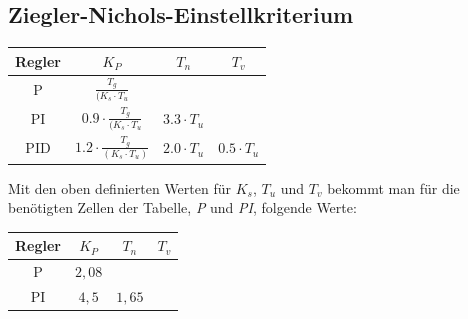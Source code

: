 \documentclass{article}
\begin{document}
		\subsection{Ziegler-Nichols-Einstellkriterium}
			\begin{center}
				\begin{tabular}{ c || c | c | c }
					 Regler & $K_P$ & $T_n$ & $T_v$ \\ 
					 \hline\hline
					 P & $\frac{T_g}{(K_s \cdot T_u}$ &  &  \\  
					 \hline
					 PI & $0.9 \cdot \frac{T_g}{(K_s \cdot T_u}$ & $3.3 \cdot T_u$ &    \\
					 \hline
					 PID & $1.2 \cdot \frac{T_g}{(K_s \cdot T_u)}$ & $2.0 \cdot T_u$ & $0.5 \cdot T_u$
				\end{tabular}
			\end{center}
\vspace{3mm}
			Mit den oben definierten Werten für $K_s$, $T_u$ und $T_v$ bekommt man für die benötigten Zellen der Tabelle, \textit{P} und \textit{PI}, folgende Werte:
			\begin{center}
				\begin{tabular}{ c || c | c | c }
					 Regler & $K_P$ & $T_n$ & $T_v$ \\ 
					 \hline\hline
					 P & $2,08$ &  &  \\  
					 \hline
					 PI & $4,5$ & $1,65$ & 
				\end{tabular}
			\end{center}
\newpage
\end{document}
